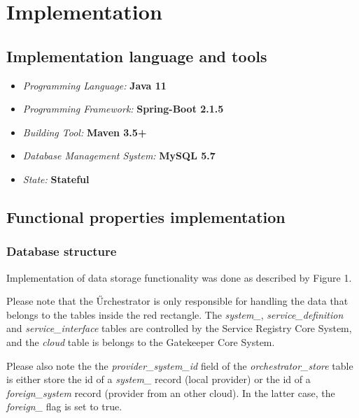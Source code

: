 \documentclass[a4paper]{arrowhead}
\begin{document}
\newpage

\section{Implementation}
\label{sec:implementation}

\subsection {Implementation language and tools}

\begin{itemize}
\item \emph{Programming Language:} \textbf{Java 11}
\item \emph{Programming Framework:} \textbf{Spring-Boot 2.1.5}
\item \emph{Building Tool:} \textbf{Maven 3.5+}
\item \emph{Database Management System:} \textbf{MySQL 5.7}
\item \emph{State:} \textbf{Stateful}
\end{itemize} 

\subsection {Functional properties implementation}

\subsubsection{Database structure}

Implementation of data storage functionality was done as described by Figure 1. 

Please note that the Űrchestrator is only responsible for handling the data that belongs to the tables inside the red rectangle. The \textit{system\_}, \textit{service\_definition} and \textit{service\_interface} tables are controlled by the Service Registry Core System, and the \textit{cloud} table is belongs to the Gatekeeper Core System.

Please also note the the \textit{provider\_system\_id} field of the \textit{orchestrator\_store} table is either store the id of a \textit{system\_} record (local provider) or the id of a \textit{foreign\_system} record (provider from an other cloud). In the latter case, the \textit{foreign\_} flag is set to true.
\end{document}
